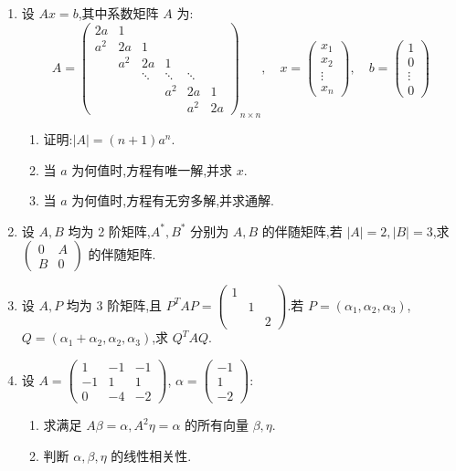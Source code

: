 \begin{enumerate}
	\item 设 $Ax = b$,其中系数矩阵 $A$ 为:
	\[ A = \begin{pmatrix} 
		2a & 1 &  &  &  \\ 
		a^2 & 2a & 1 &  &  \\ 
		& a^2 & 2a & 1 &   \\ 
		& & \ddots & \ddots & \ddots \\ 
		&   &  & a^2 & 2a & 1 \\
		& & & & a^2 & 2a
	\end{pmatrix}_{n \times n}, \quad x = \begin{pmatrix} x_1 \\ x_2 \\ \vdots \\ x_n \end{pmatrix}, \quad b = \begin{pmatrix} 1 \\ 0 \\ \vdots \\ 0 \end{pmatrix} \]
	\begin{enumerate}
		\item 证明:$|A| = (n+1)a^n$.
		\item 当 $a$ 为何值时,方程有唯一解,并求 $x$.
		\item 当 $a$ 为何值时,方程有无穷多解,并求通解.
	\end{enumerate}
	
	\item 设 $A, B$ 均为 2 阶矩阵,$A^*, B^*$ 分别为 $A, B$ 的伴随矩阵,若 $|A|=2, |B|=3$,求 $\begin{pmatrix} 0 & A \\ B & 0 \end{pmatrix}$ 的伴随矩阵.
	
	\item 设 $A, P$ 均为 3 阶矩阵,且 $P^{T}AP = \begin{pmatrix}
		1 \\
		& 1 \\
		& & 2
	\end{pmatrix}$.若 $P = (\alpha_1, \alpha_2, \alpha_3)$,$Q = (\alpha_1 + \alpha_2, \alpha_2, \alpha_3)$,求 $Q^T A Q$.
	
	\item 设 $A = \begin{pmatrix} 1 & -1 & -1 \\ -1 & 1 & 1 \\ 0 & -4 & -2 \end{pmatrix}$, $\alpha = \begin{pmatrix} -1 \\ 1 \\ -2 \end{pmatrix}$:
	\begin{enumerate}
		\item 求满足 $A\beta = \alpha, A^2 \eta = \alpha$ 的所有向量 $\beta, \eta$.
		\item 判断 $\alpha, \beta, \eta$ 的线性相关性.
	\end{enumerate}
	

\end{enumerate}
